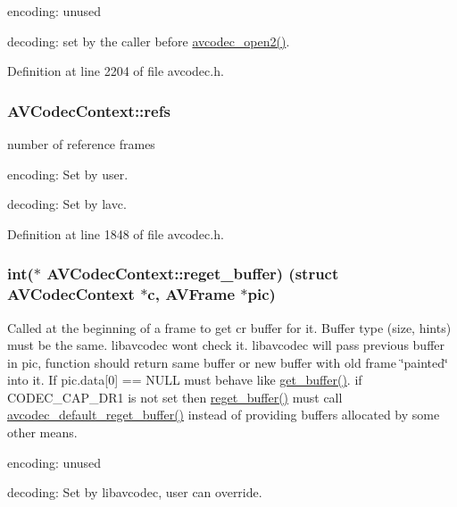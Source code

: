 \begin{DoxyItemize}
\item encoding\+: unused
\item decoding\+: set by the caller before \hyperlink{group__lavc__core_ga11f785a188d7d9df71621001465b0f1d}{avcodec\+\_\+open2()}. 
\end{DoxyItemize}

Definition at line 2204 of file avcodec.\+h.

\subsubsection[{\texorpdfstring{refs}{refs}}]{ A\+V\+Codec\+Context\+::refs}\hypertarget{struct_a_v_codec_context_aa0cb7241b4624dba761c8cf58fb2d5f0}{}\label{struct_a_v_codec_context_aa0cb7241b4624dba761c8cf58fb2d5f0}
number of reference frames
\begin{DoxyItemize}
\item encoding\+: Set by user.
\item decoding\+: Set by lavc. 
\end{DoxyItemize}

Definition at line 1848 of file avcodec.\+h.

\subsubsection[{\texorpdfstring{reget\+\_\+buffer}{reget_buffer}}]{ {\bf int}($\ast$ A\+V\+Codec\+Context\+::reget\+\_\+buffer) (struct {\bf A\+V\+Codec\+Context} $\ast${\bf c}, {\bf A\+V\+Frame} $\ast$pic)}\hypertarget{struct_a_v_codec_context_ac568dd88fe0dab777fe35641d955f44d}{}\label{struct_a_v_codec_context_ac568dd88fe0dab777fe35641d955f44d}
Called at the beginning of a frame to get cr buffer for it. Buffer type (size, hints) must be the same. libavcodec won\textquotesingle{}t check it. libavcodec will pass previous buffer in pic, function should return same buffer or new buffer with old frame \char`\"{}painted\char`\"{} into it. If pic.\+data\mbox{[}0\mbox{]} == N\+U\+LL must behave like \hyperlink{struct_a_v_codec_context_abc3a806b73306162efa218510448d54f}{get\+\_\+buffer()}. if C\+O\+D\+E\+C\+\_\+\+C\+A\+P\+\_\+\+D\+R1 is not set then \hyperlink{struct_a_v_codec_context_ac568dd88fe0dab777fe35641d955f44d}{reget\+\_\+buffer()} must call \hyperlink{group__lavc__decoding_ga3f7158d88758be42cc1ab6b9e6df9f0d}{avcodec\+\_\+default\+\_\+reget\+\_\+buffer()} instead of providing buffers allocated by some other means.
\begin{DoxyItemize}
\item encoding\+: unused
\item decoding\+: Set by libavcodec, user can override. 
\end{DoxyItemize}

